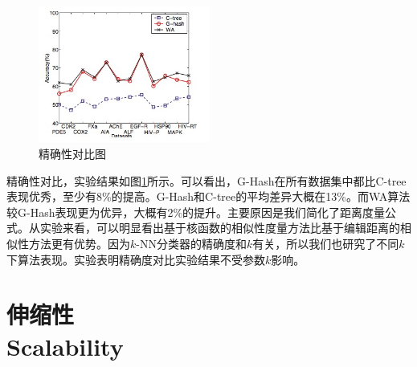 \documentclass{article}
\begin{document}
\begin{figure}[!htb]
    \centering
    \includegraphics[width=0.5\textwidth]{ac}
    \caption{精确性对比图}
    \label{fg:ac}
\end{figure}


精确性对比，实验结果如图\ref{fg:ac}所示。可以看出，G-Hash在所有数据集中都比C-tree表现优秀，至少有8\%的提高。G-Hash和C-tree的平均差异大概在13\%。而WA算法较G-Hash表现更为优异，大概有2\%的提升。主要原因是我们简化了距离度量公式。从实验来看，可以明显看出基于核函数的相似性度量方法比基于编辑距离的相似性方法更有优势。因为$k$-NN分类器的精确度和$k$有关，所以我们也研究了不同$k$下算法表现。实验表明精确度对比实验结果不受参数$k$影响。

\section{伸缩性 \\ Scalability}
\end{document}

